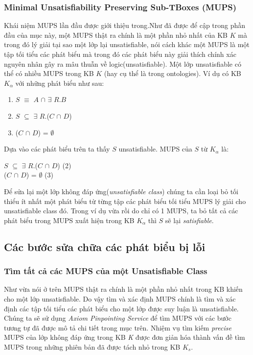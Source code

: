 \subsubsection{Minimal Unsatisfiability Preserving Sub-TBoxes (MUPS)}
Khái niệm MUPS lần đầu được giới thiệu trong\cite{mups}.Như đã được để cập trong phần đầu của mục này, một MUPS thật ra chính là một phần nhỏ nhất của KB $K$ mà trong đó lý giải tại sao một lớp lại unsatisfiable, nói cách khác một MUPS là một tập tối tiểu các phát biểu mà trong đó các phát biểu này giải thích chính xác nguyên nhân gây ra mâu thuẫn về logic(unsatisfiable). Một lớp unsatisfiable có thể có nhiều MUPS trong KB $K$ (hay cụ thể là trong ontologies). Ví dụ có KB $K_{\alpha}$ với những phát biểu như sau:
	\begin{enumerate}
		\item $S$ $\equiv$ $A$ $\cap$ $\exists$ $R.B$
		\item $S$ $\subseteq$ $\exists$ $R$.($C$ $\cap$ $D$) 
		\item ($C$ $\cap$ $D$) = $\emptyset$ 
	\end{enumerate}
	Dựa vào các phát biểu trên ta thấy $S$ unsatisfiable. MUPS của $S$ từ $K_{\alpha}$ là:
	\begin{center}
		$S$ $\subseteq$ $\exists$ $R$.($C$ $\cap$ $D$) (2)
		\\
		($C$ $\cap$ $D$) = $\emptyset$ (3)
	\end{center}
Để sửa lại một lớp không đáp ứng(\textit{unsatisfiable class}) chúng ta cần loại bỏ tối thiểu ít nhất một phát biểu từ từng tập các phát biểu tối tiểu MUPS lý giải cho unsatisfiable class đó. Trong ví dụ vừa rồi do chỉ có 1 MUPS, ta bỏ tất cả các phát biểu trong MUPS xuất hiện trong KB $K_{\alpha}$ thì $S$ sẽ lại \textit{satisfiable}.
\subsection{Các bước sửa chữa các phát biểu bị lỗi}
\subsubsection{Tìm tất cả các MUPS của một Unsatisfiable Class}
Như vừa nói ở trên MUPS thật ra chính là một phần nhỏ nhất trong KB khiến cho một lớp unsatisfiable. Do vậy tìm và xác định MUPS chính là tìm và xác định các tập tối tiểu các phát biểu cho một lớp được suy luận là  unsatisfiable. Chúng ta sẽ sử dụng \textit{Axiom Pinpointing Service}\cite{axiomPinpoint} để tìm MUPS với các bước tương tự đã được mô tả chi tiết trong mục trên. Nhiệm vụ tìm kiếm \textit{precise} MUPS của lớp không đáp ứng trong KB \textit{K} được đơn giản hóa thành vấn đề tìm MUPS trong những phiên bản đã được tách nhỏ trong KB $K_{s}$.
